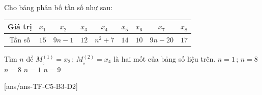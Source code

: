 \begin{ex}%
	Cho bảng phân bố tần số như sau:\\
	\begin{center}
		\begin{tabular}{|c|c|c|c|c|c|c|c|c|}
			\hline Giá trị & $x_1$ & $x_2$ & $x_3$ & $x_4$ & $x_5$ & $x_6$ & $x_7$ & $x_8$ \\
			\hline Tần số & $15$ & $9 n-1$ & $12$ & $n^2+7$ & $14$ & $10$ & $9 n-20$ & $17$ \\
			\hline
		\end{tabular}
	\end{center}
	Tìm $n$ để $M_{_o}^{(1)}=x_2\,;\,M_{_o}^{(2)}=x_4$ là hai mốt của bảng số liệu trên.
	\choice
	{$n=1\,;\,n=8$}
	{\True $n=8$}
	{$n=1$}
	{$n=9$}
\end{ex}
\cauds
{}[ans/ans-TF-C5-B3-D2]
